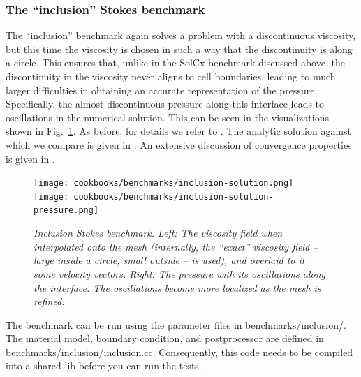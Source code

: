 \documentclass{article}
\begin{document}
\subsubsection{The ``inclusion'' Stokes benchmark}
\label{sec:benchmark-inclusion}

The ``inclusion'' benchmark again solves a problem with a discontinuous
viscosity, but this time the viscosity is chosen in such a way that the
discontinuity is along a circle. This ensures that, unlike in the SolCx
benchmark discussed above, the discontinuity in the viscosity never aligns to
cell boundaries, leading to much larger difficulties in obtaining an accurate
representation of the pressure. Specifically, the almost discontinuous
pressure along this interface leads to oscillations in the numerical
solution. This can be seen in the visualizations shown in
Fig.~\ref{fig:inclusion}. As before, for details we refer to
\cite{DMGT11}. The analytic solution against which we compare is given in
\cite{SP03}. An extensive discussion of convergence properties is given in
\cite{KHB12}.

\begin{figure}
  \begin{center}
    \texttt{[image: cookbooks/benchmarks/inclusion-solution.png]}
    \hfill
    \texttt{[image: cookbooks/benchmarks/inclusion-solution-pressure.png]}
    \caption{\it Inclusion Stokes benchmark. Left: The viscosity field
      when interpolated onto the mesh (internally, the ``exact'' viscosity
      field -- large inside a circle, small outside -- is used),
      and overlaid to it some velocity vectors. Right: The
      pressure with its oscillations along the interface. The oscillations
      become more localized as the mesh is refined.}
    \label{fig:inclusion}
  \end{center}
\end{figure}

The benchmark can be run using the parameter files in \url{benchmarks/inclusion/}. The material model, boundary condition, and postprocessor are defined in \url{benchmarks/inclusion/inclusion.cc}. Consequently, this code needs to be compiled into a shared lib before you can run the tests.



\end{document}
